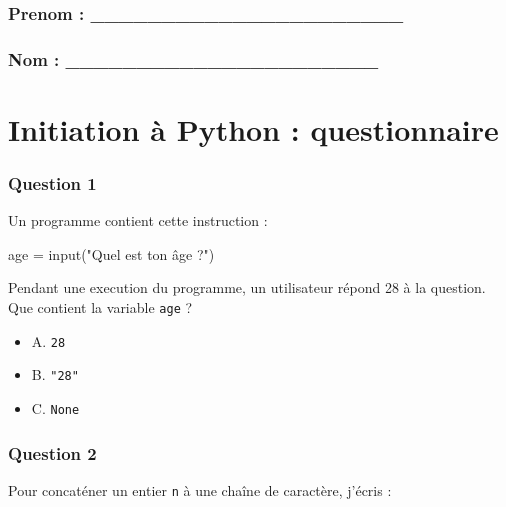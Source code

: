 \documentclass[
]{article}
\date{}
\newenvironment{Shaded}{}{}
\newcommand{\BuiltInTok}[1]{#1}
\newcommand{\NormalTok}[1]{#1}
\newcommand{\OperatorTok}[1]{\textcolor[rgb]{0.40,0.40,0.40}{#1}}
\newcommand{\StringTok}[1]{\textcolor[rgb]{0.25,0.44,0.63}{#1}}
\providecommand{\tightlist}{%
  \setlength{\itemsep}{0pt}\setlength{\parskip}{0pt}}
\begin{document}
\hypertarget{prenom-______________________}{%
\subsubsection{Prenom :
\_\_\_\_\_\_\_\_\_\_\_\_\_\_\_\_\_\_\_\_\_\_}\label{prenom-______________________}}

\hypertarget{nom-______________________}{%
\subsubsection{Nom :
\_\_\_\_\_\_\_\_\_\_\_\_\_\_\_\_\_\_\_\_\_\_}\label{nom-______________________}}

\hypertarget{initiation-uxe0-python-questionnaire}{%
\section{Initiation à Python :
questionnaire}\label{initiation-uxe0-python-questionnaire}}

\hypertarget{question-1}{%
\subsubsection{Question 1}\label{question-1}}

Un programme contient cette instruction :

\begin{Shaded}
\begin{Highlighting}[]
\NormalTok{age }\OperatorTok{=} \BuiltInTok{input}\NormalTok{(}\StringTok{"Quel est ton âge ?"}\NormalTok{)}
\end{Highlighting}
\end{Shaded}

Pendant une execution du programme, un utilisateur répond 28 à la
question. Que contient la variable \texttt{age} ?

\begin{itemize}
\tightlist
\item
  A. \texttt{28}
\item
  B. \texttt{"28"}
\item
  C. \texttt{None}
\end{itemize}

\hypertarget{question-2}{%
\subsubsection{Question 2}\label{question-2}}

Pour concaténer un entier \texttt{n} à une chaîne de caractère, j'écris
:
\end{document}
